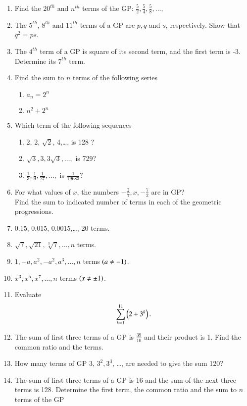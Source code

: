 \begin{enumerate}[label=\thesubsection.\arabic*.,ref=\thesubsection.\theenumi]
\item Find the $20^{th}$ and $n^{th}$ terms of the GP: $\frac{5}{2}, \frac{5}{4}, \frac{5}{8},\dots, $
\item The $5^{th}$, $8^{th}$ and $11^{th}$ terms of a GP  are $p, q$ and $s$, respectively. Show that 
$q^2 = ps$.
\item The $4^{th}$ term of a GP  is square of its second term, and the first term is -3. Determine its $7^{th}$ term.
\item Find the sum to $n$ terms of the following series
\begin{enumerate}
\item $a_n = 2^n$
\item $n^2 + 2^n$
\end{enumerate}
\item Which term of the following sequences
\begin{enumerate}
	\item 2, 2, $\sqrt{2}$, 4,\dots,  is 128 ?
	\item $\sqrt{3}, 3, 3\sqrt{3},\dots,$  is 729?
	\item $\frac{1}{3}, \frac{1}{9}, \frac{1}{27}, \dots,$  is $\frac{1}{19683}$?
\end{enumerate}
\item For what values of $x$, the numbers $-\frac{2}{7}, x, -\frac{7}{2}$ are in GP?
\\
	Find the sum to indicated number of terms in each of the geometric progressions.
\item 0.15, 0.015, 0.0015,\dots,  20 terms.
\item $\sqrt{7}, \sqrt{21}, \sqrt[3]{7}, \dots,  n$ terms.
\item $1, -a, a^2, -a^2, a^3,\dots,  n$ terms $\left(a \neq -1\right)$.
\item $x^3, x^5, x^7,\dots,  n$ terms $\left(x \neq \pm 1\right)$.
\item Evaluate $$\sum _{k=1}^{11} \left(2 + 3^k\right).$$
\item The sum of first three terms of a GP  is $\frac{39}{10}$ and their product is 1. Find the 
common ratio and the terms.
\item How many terms of GP  3, $3^2, 3^3$, \dots,  are needed to give the sum 120?
\item The sum of first three terms of a GP  is 16 and the sum of the next three terms is 128. Determine the first term, the common ratio and the sum to $n$ terms of the GP 

\end{enumerate}
